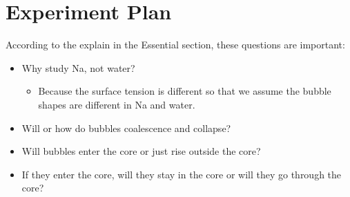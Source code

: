 \documentclass{article}
\begin{document}
\section{Experiment Plan}
\label{sec:orgd4155f2}
According to the explain in the Essential section, these questions are important:

\begin{itemize}
\item Why study Na, not water?
\begin{itemize}
\item Because the surface tension is different so that we assume the bubble shapes are different in Na and water.
\end{itemize}
\item Will or how do bubbles coalescence and collapse?
\item Will bubbles enter the core or just rise outside the core?
\item If they enter the core, will they stay in the core or will they go through the core?
\end{itemize}
\end{document}
